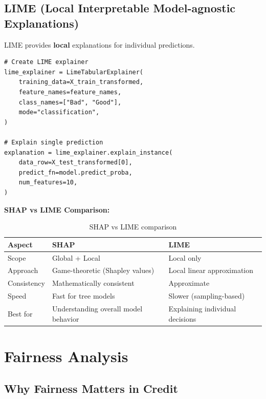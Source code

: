 \documentclass[11pt,a4paper]{article}
\begin{document}
\subsection{LIME (Local Interpretable Model-agnostic Explanations)}

LIME provides \textbf{local} explanations for individual predictions.

\begin{lstlisting}[style=pythonstyle]
# Create LIME explainer
lime_explainer = LimeTabularExplainer(
    training_data=X_train_transformed,
    feature_names=feature_names,
    class_names=["Bad", "Good"],
    mode="classification",
)

# Explain single prediction
explanation = lime_explainer.explain_instance(
    data_row=X_test_transformed[0],
    predict_fn=model.predict_proba,
    num_features=10,
)
\end{lstlisting}

\textbf{SHAP vs LIME Comparison:}

\begin{table}[H]
\centering
\begin{tabular}{@{}p{3cm}p{5cm}p{5cm}@{}}
\toprule
\textbf{Aspect} & \textbf{SHAP} & \textbf{LIME} \\
\midrule
Scope & Global + Local & Local only \\
Approach & Game-theoretic (Shapley values) & Local linear approximation \\
Consistency & Mathematically consistent & Approximate \\
Speed & Fast for tree models & Slower (sampling-based) \\
Best for & Understanding overall model behavior & Explaining individual decisions \\
\bottomrule
\end{tabular}
\caption{SHAP vs LIME comparison}
\end{table}

\section{Fairness Analysis}

\subsection{Why Fairness Matters in Credit}
\end{document}
